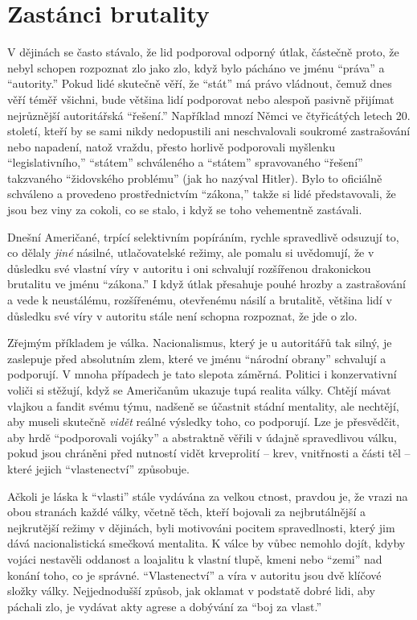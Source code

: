 \documentclass{book}
\begin{document}
\section{Zastánci brutality}

V dějinách se často stávalo, že lid podporoval odporný útlak, částečně proto, že nebyl schopen rozpoznat zlo jako zlo, když bylo pácháno ve jménu \enquote{práva} a \enquote{autority.} Pokud lidé skutečně věří, že \enquote{stát} má právo vládnout, čemuž dnes věří téměř všichni, bude většina lidí podporovat nebo alespoň pasivně přijímat nejrůznější autoritářská \enquote{řešení.} Například mnozí Němci ve čtyřicátých letech 20. století, kteří by se sami nikdy nedopustili ani neschvalovali soukromé zastrašování nebo napadení, natož vraždu, přesto horlivě podporovali myšlenku \enquote{legislativního,} \enquote{státem} schváleného a \enquote{státem} spravovaného \enquote{řešení} takzvaného \enquote{židovského problému} (jak ho nazýval Hitler). Bylo to oficiálně schváleno a provedeno prostřednictvím \enquote{zákona,} takže si lidé představovali, že jsou bez viny za cokoli, co se stalo, i když se toho vehementně zastávali.

Dnešní Američané, trpící selektivním popíráním, rychle spravedlivě odsuzují to, co dělaly \emph{jiné} násilné, utlačovatelské režimy, ale pomalu si uvědomují, že v důsledku své vlastní víry v autoritu i oni schvalují rozšířenou drakonickou brutalitu ve jménu \enquote{zákona.} I když útlak přesahuje pouhé hrozby a zastrašování a vede k neustálému, rozšířenému, otevřenému násilí a brutalitě, většina lidí v důsledku své víry v autoritu stále není schopna rozpoznat, že jde o zlo.

Zřejmým příkladem je válka. Nacionalismus, který je u autoritářů tak silný, je zaslepuje před absolutním zlem, které ve jménu \enquote{národní obrany} schvalují a podporují. V mnoha případech je tato slepota záměrná. Politici i konzervativní voliči si stěžují, když se Američanům ukazuje tupá realita války. Chtějí mávat vlajkou a fandit svému týmu, nadšeně se účastnit stádní mentality, ale nechtějí, aby museli skutečně \emph{vidět} reálné výsledky toho, co podporují. Lze je přesvědčit, aby hrdě \enquote{podporovali vojáky} a abstraktně věřili v údajně spravedlivou válku, pokud jsou chráněni před nutností vidět krveprolití -- krev, vnitřnosti a části těl -- které jejich \enquote{vlastenectví} způsobuje.

Ačkoli je láska k \enquote{vlasti} stále vydávána za velkou ctnost, pravdou je, že vrazi na obou stranách každé války, včetně těch, kteří bojovali za nejbrutálnější a nejkrutější režimy v dějinách, byli motivováni pocitem spravedlnosti, který jim dává nacionalistická smečková mentalita. K válce by vůbec nemohlo dojít, kdyby vojáci nestavěli oddanost a loajalitu k vlastní tlupě, kmeni nebo \enquote{zemi} nad konání toho, co je správné. \enquote{Vlastenectví} a víra v autoritu jsou dvě klíčové složky války. Nejjednodušší způsob, jak oklamat v podstatě dobré lidi, aby páchali zlo, je vydávat akty agrese a dobývání za \enquote{boj za vlast.}
\end{document}
